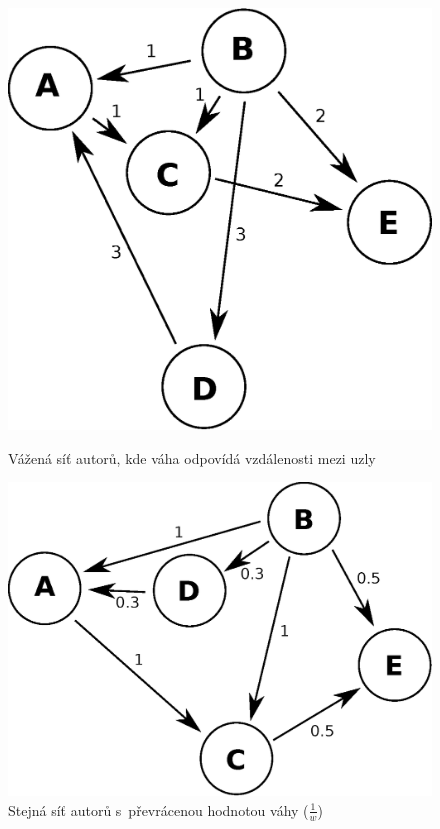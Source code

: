 \documentclass{bakalarka}
\begin{document}
\begin{figure}[!ht]
\begin{minipage}[b]{0.45\textwidth}
\centering
	\includegraphics[width=\textwidth]{wNormal.eps}
	\caption{Vážená síť autorů, kde váha odpovídá vzdálenosti mezi uzly}
	\label{fig:wNormal}
\end{minipage}
\hspace{0.5cm}
\begin{minipage}[b]{0.45\textwidth}
\centering
	\includegraphics[width=\textwidth]{wRecip.eps}
	\caption{Stejná síť autorů s~převrácenou hodnotou váhy ($\frac{1}{w}$)}
	\label{fig:wRecip}
\end{minipage}
\end{figure}
\end{document}
